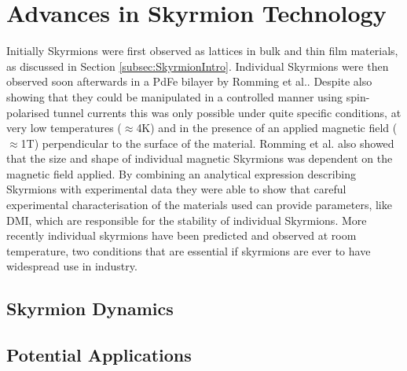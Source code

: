 
\section{Advances in Skyrmion Technology}\label{sec:AdvancesSkyrmionTech}
Initially Skyrmions were first observed as lattices in bulk and thin film materials, as discussed in Section \ref{subsec:SkyrmionIntro}. Individual Skyrmions were then observed soon afterwards in a PdFe bilayer by Romming et al.\cite{Romming2013}. Despite also showing that they could be manipulated in a controlled manner using spin-polarised tunnel currents this was only possible under quite specific conditions, at very low temperatures ($\approx$4K) and in the presence of an applied magnetic field ($\approx$1T) perpendicular to the surface of the material\cite{Romming2013}. Romming et al. also showed that the size and shape of individual magnetic Skyrmions was dependent on the magnetic field applied. By combining an analytical expression describing Skyrmions with experimental data they were able to show that careful experimental characterisation of the materials used can provide parameters, like DMI, which are responsible for the stability of individual Skyrmions\cite{Romming2015}. More recently individual skyrmions have been predicted\cite{Moreau-Luchaire2016} and observed at room temperature\cite{Woo2016,Boulle2016}, two conditions that are essential if skyrmions are ever to have widespread use in industry.

    \subsection{Skyrmion Dynamics}\label{subsec:Dynamics}

    \subsection{Potential Applications}\label{subsec:Applications}

